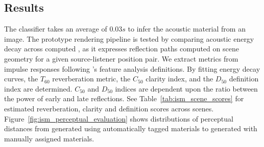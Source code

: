 \subsection{Results}
The classifier takes an average of $0.03s$ to infer the acoustic material from an image. The prototype rendering pipeline is tested by comparing acoustic energy decay across computed , as it expresses reflection paths computed on scene geometry for a given source-listener position pair. We extract metrics from impulse responses following \cite{lima_RIR_Parameters}'s feature analysis definitions. By fitting energy decay curves, the $T_{60}$ reverberation metric, the $C_{50}$ clarity index, and the $D_{50}$ definition index are determined. $C_{50}$ and $D_{50}$ indices are dependent upon the ratio between the power of early and late reflections. See Table~\ref{tab:ism_scene_scores} for estimated reverberation, clarity and definition scores across scenes. Figure~\ref{fig:ism_perceptual_evaluation} shows distributions of perceptual distances from  generated using automatically tagged materials to  generated with manually assigned materials. \par


